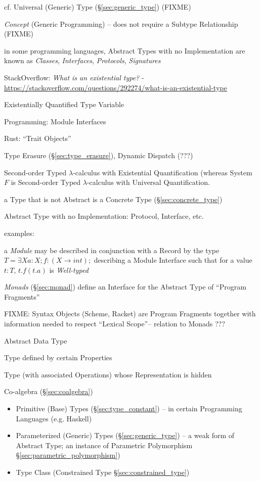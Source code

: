 cf. Universal (Generic) Type (\S\ref{sec:generic_type}) (FIXME)

\emph{Concept} (Generic Programming) -- does not require a Subtype Relationship
(FIXME)

in some programming languages, Abstract Types with no Implementation are known
as \emph{Classes}, \emph{Interfaces}, \emph{Protocols}, \emph{Signatures}

StackOverflow: \emph{What is an existential type?} -
\url{https://stackoverflow.com/questions/292274/what-is-an-existential-type}

Existentially Quantified Type Variable

Programming: Module Interfaces

Rust: ``Trait Objects''

Type Erasure (\S\ref{sec:type_erasure}), Dynamic Dispatch (???)

Second-order Typed $\lambda$-calculus with Existential Quantification
(whereas System $F$ is Second-order Typed $\lambda$-calculus with
Universal Quantification.

a Type that is not Abstract is a Concrete Type
(\S\ref{sec:concrete_type})

Abstract Type with no Implementation: Protocol, Interface, etc.

examples:

a \emph{Module} may be described in conjunction with a Record by the type $T =
\exists X { a : X; f : (X \rightarrow int); }$ describing a Module Interface
such that for a value $t : T$, $t.f (t.a)$ is \emph{Well-typed}

\emph{Monads} (\S\ref{sec:monad}) define an Interface for the Abstract
Type of ``Program Fragments''

FIXME: Syntax Objects (Scheme, Racket) are Program Fragments together
with information needed to respect ``Lexical Scope''-- relation to
Monads ???


\asterism


Abstract Data Type

Type defined by certain Properties %

Type (with associated Operations) whose Representation is hidden

Co-algebra (\S\ref{sec:coalgebra})

\begin{itemize}
  \item Primitive (Base) Types (\S\ref{sec:type_constant}) -- in
    certain Programming Languages (e.g. Haskell)
  \item Parameterized (Generic) Types (\S\ref{sec:generic_type}) -- a
    weak form of Abstract Type; an instance of Parametric Polymorphism
    \S\ref{sec:parametric_polymorphism})
  \item Type Class (Constrained Type \S\ref{sec:constrained_type})
\end{itemize}


